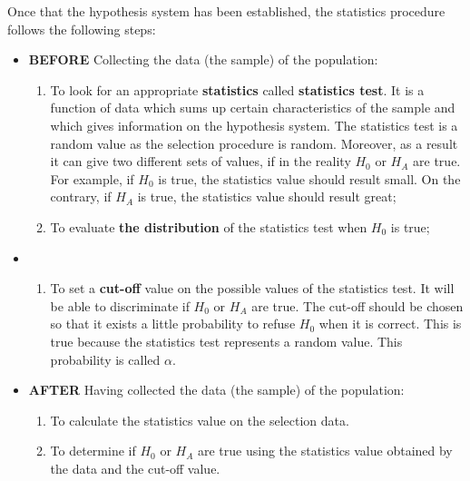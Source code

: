 \begin{frame}
  \vspace*{.25cm}
  Once that the hypothesis system has been established, the statistics procedure follows the following steps:
  \begin{itemize}
    \vspace*{.25cm}
    \item[\checkmark] \textbf{BEFORE} Collecting the data (the sample) of the population:
    \begin{enumerate}
    \vspace*{.25cm}
      \item To look for an appropriate \textbf{statistics} called \textbf{statistics test}. It is a function of data which sums up certain characteristics  of the sample and which gives information on the hypothesis system. The statistics test is a random value as the selection procedure is random. Moreover, as a result it can give two different sets of values, if in the reality $H_0$ or $ H_A $ are true. For example, if $H_0$ is true, the statistics value should result small. On the contrary, if $ H_A $ is true, the statistics value should result great;
      \vspace*{.25cm}
      \item To evaluate \textbf{the distribution} of the statistics test when $H_0$ is true;
    \end{enumerate}
  \end{itemize}
\end{frame}

\begin{frame}
  \vspace*{.25cm}
  \begin{itemize}
    \item[] 
    \begin{enumerate}
      \setcounter{enumi}{+2}
      \item To set a \textbf{cut-off} value on the possible values of the statistics test. It will be able to discriminate if $H_0$ or $ H_A $ are true. The cut-off should be chosen so that it exists a little probability to refuse $H_0$ when it is correct. This is true because the statistics test represents a random value. This probability is called {\boldmath$\alpha$}.
    \end{enumerate}
  \end{itemize}
  \begin{itemize}
    \item[\checkmark] \textbf{AFTER} Having collected the data (the sample) of the population:
    \vspace*{.25cm}
    \begin{enumerate}
      \item To calculate the statistics value on the selection data.
      \vspace*{.25cm}
      \item To determine if $H_0$ or $ H_A $ are true using the statistics value obtained by the data and the cut-off value.
    \end{enumerate}
  \end{itemize}
\end{frame}

